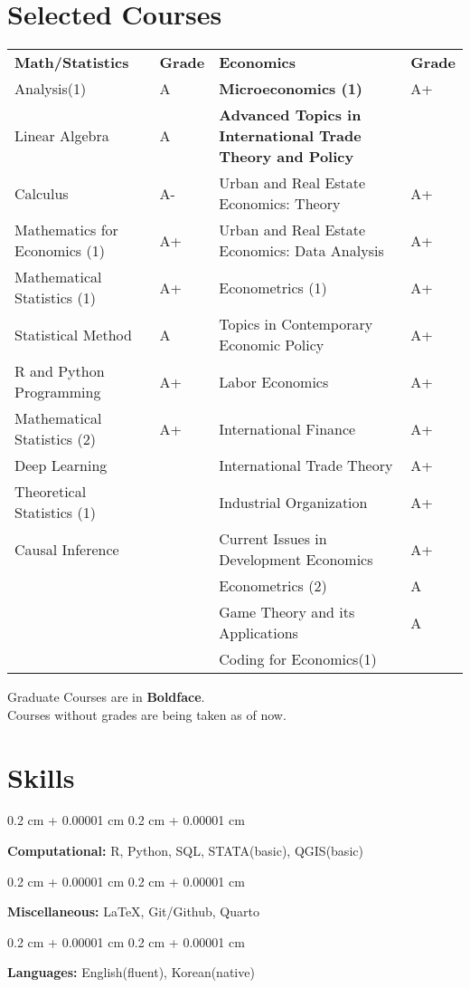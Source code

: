 \documentclass[10pt, letterpaper]{article}
\newenvironment{onecolentry}{
	\begin{adjustwidth}{
			0.2 cm + 0.00001 cm
		}{
			0.2 cm + 0.00001 cm
		}
	}{
	\end{adjustwidth}
} %
\begin{document}
\section{Selected Courses}
\setlength{\tabcolsep}{3pt}
\begin{tabularx}{\textwidth}{|>{\centering\arraybackslash}X|>{\centering\arraybackslash}p{1cm}|>{\centering\arraybackslash}p{7
			cm}|>{\centering\arraybackslash}p{1cm}|}
	\hline
	\textbf{Math/Statistics} & \textbf{Grade} & \textbf{Economics} & \textbf{Grade} \\
	\hhline{|=|=|=|=|}
	Analysis(1) & A & \textbf{Microeconomics (1)} &A+ \\ \hline
	Linear Algebra & A& \textbf{Advanced Topics in International Trade Theory and Policy} & \\ \hline
	Calculus&A-&Urban and Real Estate Economics: Theory&A+\\ \hline
	Mathematics for Economics (1)&A+&Urban and Real Estate Economics: Data Analysis&A+\\ \hline
	Mathematical Statistics (1)&A+&Econometrics (1)& A+\\ \hline
	Statistical Method & A& Topics in Contemporary Economic Policy & A+\\ \hline
	R and Python Programming&A+&Labor Economics&A+\\ \hline
	Mathematical Statistics (2)&A+& International Finance & A+\\ \hline
Deep Learning	&&International Trade Theory&A+\\ \hline
Theoretical Statistics (1)	&&Industrial Organization&A+\\ \hline
Causal Inference&&Current Issues in Development Economics&A+\\ \hline
			&&Econometrics (2)&A\\ \hline
&&Game Theory and its Applications&A\\  \hline
&&Coding for Economics(1)&\\ 
	
	
	\hline  

\end{tabularx}
\noindent Graduate Courses are in \textbf{Boldface}.\\
\noindent Courses without grades are being taken as of now.
	

	\section{Skills}
	
	\begin{onecolentry}
		\textbf{Computational:} R, Python, SQL, STATA(basic), QGIS(basic)
	\end{onecolentry}
	
	\vspace{0.2 cm}
	
	\begin{onecolentry}
		\textbf{Miscellaneous:} \LaTeX, Git/Github, Quarto
	\end{onecolentry}
	
	\vspace{0.2 cm}
	
	\begin{onecolentry}
		\textbf{Languages:} English(fluent), Korean(native)
	\end{onecolentry}
	
	
	
	
\end{document}
